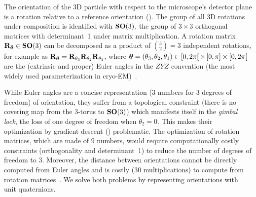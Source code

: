 The orientation of the 3D particle with respect to the microscope's detector plane is a rotation relative to a reference orientation ().
The group of all 3D rotations under composition is identified with $\mathrm{\mathbf{SO}}(3)$, the group of $3 \times 3$ orthogonal matrices with determinant~1 under matrix multiplication.
A rotation matrix $\mathbf{R}_{{\boldsymbol{\theta}}} \in \mathrm{\mathbf{SO}}(3)$ can be decomposed as a product of $\binom{3}{2}=3$ independent rotations, for example as $\mathbf{R}_{{\boldsymbol{\theta}}} = \mathbf{R}_{\theta_3} \mathbf{R}_{\theta_2} \mathbf{R}_{\theta_1}$, where ${\boldsymbol{\theta}} = (\theta_3,\theta_2,\theta_1) \in [0,2\pi[ \, \times \, [0,\pi] \times [0,2\pi[$ are the (extrinsic and proper) Euler angles in the $ZYZ$ convention (the most widely used parameterization in cryo-EM)~\cite{sorzano2014interchanging}.

While Euler angles are a concise representation ($3$ numbers for $3$ degrees of freedom) of orientation, they suffer from a topological constraint (there is no covering map from the $3$-torus to $\mathrm{\mathbf{SO}}(3)$) which manifests itself in the \textit{gimbal lock}, the loss of one degree of freedom when $\theta_2=0$. %
This makes their optimization by gradient descent () problematic.
The optimization of rotation matrices, which are made of $9$ numbers, would require computationally costly constraints (orthogonality and determinant~1) to reduce the number of degrees of freedom to $3$.
Moreover, the distance between orientations cannot be directly computed from Euler angles and is costly (30 multiplications) to compute from rotation matrices~\cite{huynh2009metrics}.
We solve both problems by representing orientations with unit quaternions.

